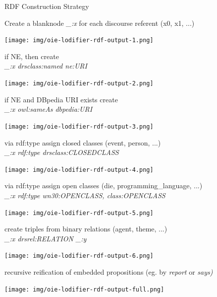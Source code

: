 \documentclass[11pt]{beamer}
\begin{document}
		\begin{frame}[allowframebreaks]{RDF Construction Strategy}
			
			Create a blanknode \textit{\_:x} for each discourse referent (x0, x1, ...)
			\framebreak			
			\begin{center}
				\texttt{[image: img/oie-lodifier-rdf-output-1.png]}
			\end{center}
			\framebreak
			if NE, then create\\
					\textit{\_:x drsclass:named ne:URI}
			\framebreak
			\begin{center}
				\texttt{[image: img/oie-lodifier-rdf-output-2.png]}
			\end{center}
			\framebreak
			if NE and DBpedia URI exists create\\
					\textit{\_:x owl:sameAs dbpedia:URI}
			\framebreak
			\begin{center}
				\texttt{[image: img/oie-lodifier-rdf-output-3.png]}
			\end{center}
			\framebreak
			via rdf:type assign closed classes (event, person, ...)\\
					\textit{\_:x rdf:type drsclass:CLOSEDCLASS}			
			\framebreak
			\begin{center}
				\texttt{[image: img/oie-lodifier-rdf-output-4.png]}
			\end{center}
			\framebreak
			via rdf:type assign open classes (die, programming\_language, ...)\\
					\textit{\_:x rdf:type wn30:OPENCLASS, class:OPENCLASS}
			\framebreak
			\begin{center}
				\texttt{[image: img/oie-lodifier-rdf-output-5.png]}
			\end{center}
			\framebreak
			create triples from binary relations (agent, theme, ...)\\
					\textit{\_:x drsrel:RELATION \_:y}
			\framebreak
			\begin{center}
				\texttt{[image: img/oie-lodifier-rdf-output-6.png]}
			\end{center}
			\framebreak
			recursive reification of embedded propositions (eg. by \textit{report} or \textit{says)}			
			\framebreak
			\begin{center}
				\texttt{[image: img/oie-lodifier-rdf-output-full.png]}
			\end{center}
		\end{frame}
\end{document}
